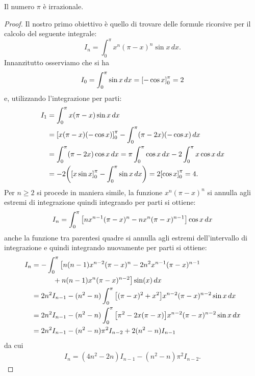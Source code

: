 \begin{theorem}[irrazionalità di $\pi$]
Il numero $\pi$ è irrazionale.
\end{theorem}
%
\begin{proof}
Il nostro primo obiettivo è quello di trovare delle formule
ricorsive per il calcolo del seguente integrale:
\[
  I_n = \int_0^\pi x^n (\pi-x)^n \sin x\, dx.
\]
Innanzitutto osserviamo che si ha
\[
  I_0 = \int_0^\pi \sin x\, dx = {\left[ -\cos x \right]}_0^\pi = 2
\]
e, utilizzando l'integrazione per parti:
\begin{align*}
  I_1 &= \int_0^\pi x(\pi-x)\sin x\, dx\\
      &= {\left[ x(\pi-x)(-\cos x) \right]}_0^\pi
       -\int_0^\pi (\pi-2x)(-\cos x)\, dx \\
      &= \int_0^\pi (\pi-2x)\cos x\, dx
      = \pi \int_0^\pi \cos x\, dx - 2 \int_0^\pi x\cos x\, dx \\
      &= - 2 {\left( {\left[ x\sin x \right]}_0^\pi - \int_0^\pi \sin x\, dx \right)}
      = 2 {\left[ \cos x \right]}_0^\pi = 4.
\end{align*}
Per $n\ge 2$ si procede in maniera simile,
la funzione $x^n (\pi-x)^n$ si
annulla agli estremi di integrazione quindi integrando per parti
 si ottiene:
\[
  I_n = \int_0^\pi {\left[ n x^{n-1}(\pi-x)^n - n x^n (\pi-x)^{n-1} \right]} \cos x\, dx
\]
anche la funzione tra parentesi quadre si annulla
agli estremi dell'intervallo di integrazione e quindi integrando nuovamente
per parti si ottiene:
\begin{align*}
  I_n &= -\int_0^\pi \big[n(n-1) x^{n-2}(\pi-x)^n
    - 2n^2 x^{n-1}(\pi-x)^{n-1} \\
  &\qquad\quad   + n(n-1) x^n(\pi-x)^{n-2}\big] \sin(x)\, dx \\
  &= 2n^2 I_{n-1} - (n^2-n) \int_0^\pi {\left[ (\pi-x)^2 + x^2 \right]}x^{n-2}(\pi-x)^{n-2} \sin x\, dx \\
  &= 2n^2 I_{n-1} - (n^2-n) \int_0^\pi {\left[ \pi^2 - 2x(\pi-x) \right]}x^{n-2}(\pi-x)^{n-2}\sin x\, dx \\
  &= 2n^2 I_{n-1} - (n^2-n) \pi^2 I_{n-2} + 2(n^2-n) I_{n-1}
\end{align*}
da cui
\begin{align}\label{eq:9530978}
   I_n = (4n^2-2n)I_{n-1} -(n^2-n)\pi^2 I_{n-2}.
\end{align}


\end{proof}
